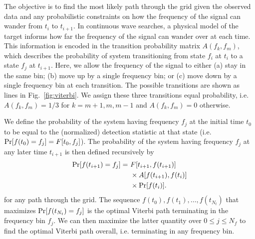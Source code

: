 \documentclass[paper-main.tex]{subfiles}
\begin{document}


The objective is to find the most likely path through the grid given the observed data and any probabilistic constraints on how the frequency of the signal can wander from $t_i$ to $t_{i+1}$. 
In continuous wave searches, a physical model of the target informs how far the frequency of the signal can wander over at each time. 
This information is encoded in the transition probability matrix $A(f_k,f_m)$, which describes the probability of system transitioning from state $f_i$ at $t_i$ to a state $f_{j}$ at $t_{i+1}$. 
Here, we allow the frequency of the signal to either (a) stay in the same bin; (b) move up by a single frequency bin; or (c) move down by a single frequency bin at each transition. 
The possible transitions are shown as lines in Fig.~\ref{fig:viterbi}.
We assign these three transitions equal probability, i.e.\ $A(f_k,f_m)=1/3$ for $k=m+1,m,m-1$ and $A(f_k,f_m)=0$ otherwise.



We define the probability of the system having frequency $f_j$ at the initial time $t_0$ to be equal to the (normalized) detection statistic at that state (i.e.\  ${\rm Pr}[f(t_0) = f_j] = F[t_0,f_j]$).
The probability of the system having frequency $f_j$ at any later time $t_{i+1}$ is then defined recursively by
\begin{eqnarray}
{\rm Pr}[f(t_{i+1})=f_j] =~& F[t_{i+1},f(t_{i+1})] \nonumber \\
                     &\times A[f(t_{i+1}),f(t_i)]  \nonumber \\
                     &\times {\rm Pr}[f(t_i)].
\label{eqn:recursiveViterbi}
\end{eqnarray}
for any path through the grid. 
The sequence $f(t_0),f(t_1),\dots,f(t_{N_t})$ that maximizes ${\rm Pr}[f(t_{N_t}) = f_j]$ is the optimal Viterbi path terminating in the frequency bin $f_j$. 
We can then maximize the latter quantity over $0 \leq j \leq N_f$ to find the optimal Viterbi path overall, i.e. terminating in any frequency bin. 
\end{document}

